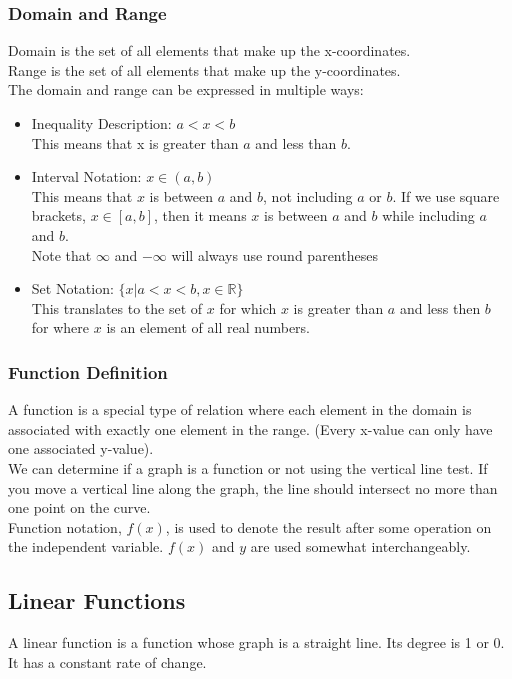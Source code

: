\documentclass[11pt, fleqn]{article}
\begin{document}
\subsubsection{Domain and Range}
Domain is the set of all elements that make up the x-coordinates.\\
Range is the set of all elements that make up the y-coordinates.\\
The domain and range can be expressed in multiple ways:
\begin{itemize}
    \item Inequality Description: $a<x<b$\\
    This means that x is greater than $a$ and less than $b$.
    \item Interval Notation: $x\in (a,b)$\\
    This means that $x$ is between $a$ and $b$, not including $a$ or $b$. If we use square brackets, $x\in [a,b]$, then it means $x$ is between $a$ and $b$ while including $a$ and $b$.\\
    Note that $\infty$ and $-\infty$ will always use round parentheses
    \item Set Notation: $\{x|a<x<b,x\in\mathbb{R}\}$\\
    This translates to the set of $x$ for which $x$ is greater than $a$ and less then $b$ for where $x$ is an element of all real numbers.
\end{itemize}

\subsubsection{Function Definition}
A function is a special type of relation where each element in the domain is associated with exactly one element in the range. (Every x-value can only have one associated y-value).\\
We can determine if a graph is a function or not using the vertical line test. If you move a vertical line along the graph, the line should intersect no more than one point on the curve.\\
Function notation, $f(x)$, is used to denote the result after some operation on the independent variable. $f(x)$ and $y$ are used somewhat interchangeably.










\subsection{Linear Functions}
A linear function is a function whose graph is a straight line. Its degree is 1 or 0. It has a constant rate of change.
\end{document}
